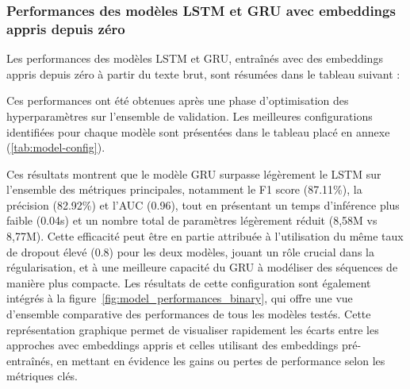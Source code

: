 \documentclass[12pt]{report}
\begin{document}
\subsubsection{Performances des modèles LSTM et GRU avec embeddings appris depuis zéro}

Les performances des modèles LSTM et GRU, entraînés avec des embeddings appris depuis zéro à partir du texte brut, sont résumées dans le tableau suivant :

\begin{table}[H]
\centering
\renewcommand{\arraystretch}{1.2}
\caption{Résultats obtenus pour la classification binaire avec embeddings appris depuis zéro sur l'ensemble de test.}
\label{tab:model_performance_scratch}
\end{table}

Ces performances ont été obtenues après une phase d’optimisation des hyperparamètres sur l’ensemble de validation. Les meilleures configurations identifiées pour chaque modèle sont présentées dans le tableau placé en annexe (\autoref{tab:model-config}).

Ces résultats montrent que le modèle GRU surpasse légèrement le LSTM sur l’ensemble des métriques principales, notamment le F1 score (87.11\%), la précision (82.92\%) et l’AUC (0.96), tout en présentant un temps d’inférence plus faible (0.04s) et un nombre total de paramètres légèrement réduit (8,58M vs 8,77M). Cette efficacité peut être en partie attribuée à l’utilisation du même taux de dropout élevé (0.8) pour les deux modèles, jouant un rôle crucial dans la régularisation, et à une meilleure capacité du GRU à modéliser des séquences de manière plus compacte. Les résultats de cette configuration sont également intégrés à la figure~\ref{fig:model_performances_binary}, qui offre une vue d’ensemble comparative des performances de tous les modèles testés. Cette représentation graphique permet de visualiser rapidement les écarts entre les approches avec embeddings appris et celles utilisant des embeddings pré-entraînés, en mettant en évidence les gains ou pertes de performance selon les métriques clés.
\end{document}
